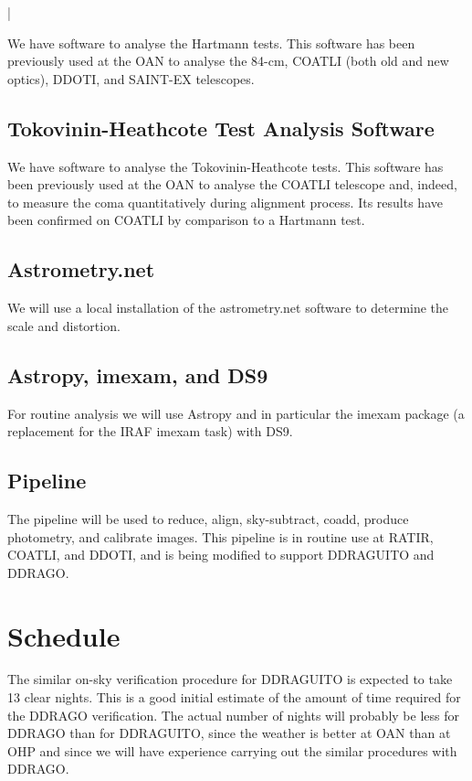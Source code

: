 |\documentclass{article}
\begin{document}
We have software to analyse the Hartmann tests. This software has been previously used at the OAN to analyse the 84-cm, COATLI (both old and new optics), DDOTI, and SAINT-EX telescopes.

\subsection{Tokovinin-Heathcote Test Analysis Software}

We have software to analyse the Tokovinin-Heathcote tests. This software has been previously used at the OAN to analyse the COATLI telescope and, indeed, to measure the coma quantitatively during alignment process. Its results have been confirmed on COATLI by comparison to a Hartmann test.

\subsection{Astrometry.net}

We will use a local installation of the astrometry.net software to determine the scale and distortion.

\subsection{Astropy, imexam, and DS9}

For routine analysis we will use Astropy and in particular the imexam package (a replacement for the IRAF imexam task) with DS9.

\subsection{Pipeline}

The pipeline will be used to  reduce, align, sky-subtract, coadd, produce photometry, and calibrate images. This pipeline is in routine use at RATIR, COATLI, and DDOTI, and is being modified to support DDRAGUITO and DDRAGO.

\section{Schedule}
\label{section:schedule}

The similar on-sky verification procedure for DDRAGUITO is expected to take 13 clear nights. This is a good initial estimate of the amount of time required for the DDRAGO verification. The actual number of nights will probably be less for DDRAGO than for DDRAGUITO, since the weather is better at OAN than at OHP and since we will have experience carrying out the similar procedures with DDRAGO.
\end{document}
